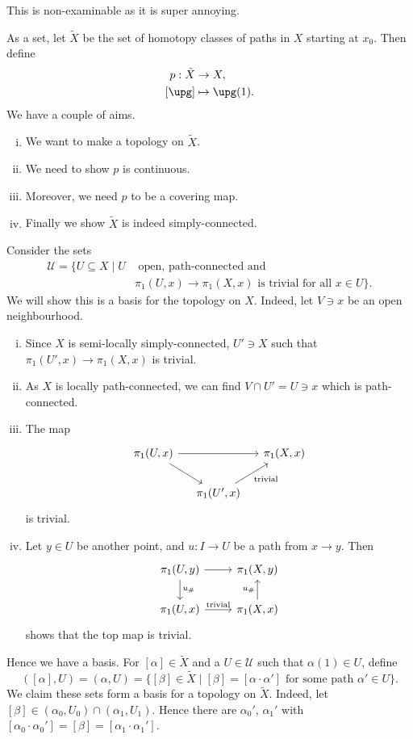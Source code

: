 \documentclass[12pt]{article}
\begin{document}
\begin{proofbox}
	This is non-examinable as it is super annoying.

	As a set, let $\tilde X$ be the set of homotopy classes of paths in $X$ starting at $x_0$. Then define
	\begin{align*}
		p : \tilde X &\to X, \\
		[\upg] &\mapsto \upg(1).
	\end{align*}
	We have a couple of aims.
	\begin{enumerate}[(i)]
		\item We want to make a topology on $\tilde X$.
		\item We need to show $p$ is continuous.
		\item Moreover, we need $p$ to be a covering map.
		\item Finally we show $\tilde X$ is indeed simply-connected.
	\end{enumerate}
	Consider the sets
	\begin{align*}
		\mathcal{U} = \{ U \subseteq X \mid U &\text{ open, path-connected and}\\
		&\pi_1(U, x) \to \pi_1(X, x) \text{ is trivial for all } x \in U\}.
	\end{align*}
	We will show this is a basis for the topology on $X$. Indeed, let $V \ni x$ be an open neighbourhood.
	\begin{enumerate}[(i)]
		\item Since $X$ is semi-locally simply-connected, $U' \ni X$ such that $\pi_1(U', x) \to \pi_1(X, x)$ is trivial.
		\item As $X$ is locally path-connected, we can find $V \cap U' = U \ni x$ which is path-connected.
		\item The map
			\[
			\begin{tikzcd}[column sep = small]
				\pi_1(U, x) \arrow[rr] \arrow[rd] & & \pi_1(X, x) \\
						       & \pi_1(U', x) \arrow[ur, "\mathrm{trivial}"']
			\end{tikzcd}
			\]
			is trivial.
		\item Let $y \in U$ be another point, and $u : I \to U$ be a path from $x \to y$. Then
			\[
			\begin{tikzcd}
				\pi_1(U, y) \arrow[r] \arrow[d, "u_{\#}"] & \pi_1(X, y) \\
				\pi_1(U, x) \arrow[r, "\mathrm{trivial}"] & \pi_1(X, x) \arrow[u, "u_{\#}"]
			\end{tikzcd}
			\]
			shows that the top map is trivial.
	\end{enumerate}
	Hence we have a basis. For $[\alpha] \in \tilde X$ and a $U \in \mathcal{U}$ such that $\alpha(1) \in U$, define
	\[
		([\alpha], U) = (\alpha, U) = \{[\beta] \in \tilde X \mid [\beta] = [\alpha \cdot \alpha'] \text{ for some path } \alpha' \in U\}.
	\]
	We claim these sets form a basis for a topology on $\tilde X$. Indeed, let $[\beta] \in (\alpha_0, U_0) \cap (\alpha_1, U_1)$. Hence there are $\alpha_0'$, $\alpha_1'$ with $[\alpha_0 \cdot \alpha_0'] = [\beta] = [\alpha_1 \cdot \alpha_1']$.


\end{proofbox}
\end{document}
